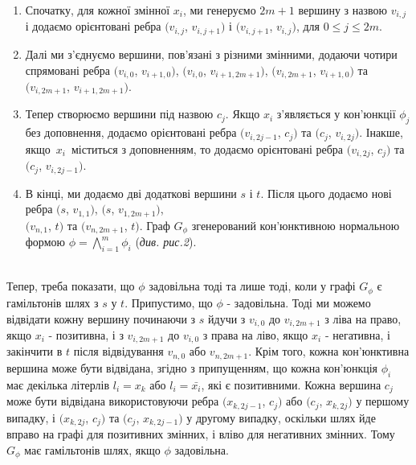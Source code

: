 \documentclass[14pt]{article}
\begin{document}
\begin{spacing}{1.175}
    \begin{enumerate}
        \item  Спочатку, для кожної змінної \(x_i\), ми генеруємо \(2m+1\) вершину з назвою \(v_{i,j}\) і додаємо орієнтовані ребра \((v_{i,j}\), \(v_{i,j+1})\) і \((v_{i,j+1}\), \(v_{i,j})\), для \(0 \le j \le 2m\).
        
        \item  Далі ми з’єднуємо вершини, пов’язані з різними змінними, додаючи чотири спрямовані ребра \((v_{i,0}\), \(v_{i+1,0})\), \((v_{i,0}\), \(v_{i+1,2m+1})\), \((v_{i,2m+1}\), \(v_{i+1,0})\) та \((v_{i,2m+1}\), \(v_{i+1,2m+1})\).
        
        \item  Тепер створюємо вершини під назвою \(c_{j}\). Якщо \(x_i\) з'являється у кон'юнкції \(\phi_{j}\) без доповнення, додаємо орієнтовані ребра
        \((v_{i,2j-1}\), \(c_{j})\) та \((c_{j}\), \(v_{i,2j})\). Інакше, якщо \(\,x_i\,\) міститься з доповненням, то додаємо орієнтовані ребра \((v_{i,2j}\), \(c_{j})\) та \((c_{j}\), \(v_{i,2j-1})\).
        
        \item В кінці, ми додаємо дві додаткові вершини \(s\) і \(t\). Після цього додаємо нові ребра \((s\), \(v_{1,1})\), \((s\), \(v_{1,2m+1})\), \\\((v_{n,1}\), \(t)\) та \((v_{n,2m+1}\), \(t)\). Граф \(G_{\phi}\) згенерований кон'юнктивною нормальною формою \(\phi = \bigwedge\limits_{i=1}^m \phi_{i}\) (\textit{див. рис.2}).
    \end{enumerate}
    \\

    \quad Тепер, треба показати, що \(\phi\) задовільна тоді та лише тоді, коли у графі \(G_{\phi}\) є гамільтонів шлях з \(s\) у \(t\). Припустимо, що \(\phi\) - задовільна. Тоді ми можемо відвідати кожну вершину починаючи з \(s\) йдучи з \(v_{i,0}\) до \(v_{i,2m+1}\) з ліва на право, якщо \(x_i\) - позитивна, і з \(v_{i,2m+1}\) до \(v_{i,0}\) з права на ліво, якщо \(x_i\) - негативна, і закінчити в \(t\) після відвідування \(v_{n,0}\) або \(v_{n,2m+1}\). Крім того, кожна кон'юнктивна вершина може бути відвідана, згідно з припущенням, що кожна кон'юнкція \(\phi_{i}\) має декілька літерлів \(l_i = x_k\) або \(l_i = \bar{x_i}\), які є позитивними. Кожна вершина \(c_j\) може бути відвідана використовуючи ребра \((x_{k,2j-1}\), \(c_{j})\) або \((c_{j}\), \(x_{k,2j})\) у першому випадку, і \((x_{k,2j}\), \(c_{j})\) та \((c_{j}\), \(x_{k,2j-1})\) у другому випадку, оскільки шлях йде вправо на графі для позитивних змінних, і вліво для негативних змінних. Тому \(G_{\phi}\) має гамільтонів шлях, якщо \(\phi\) задовільна.
    

\end{spacing}
\end{document}
